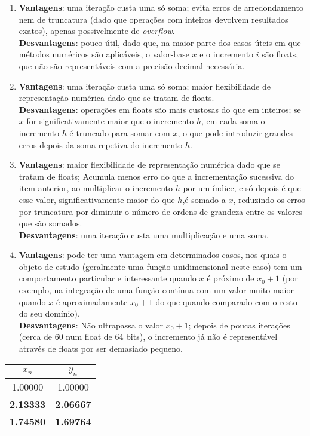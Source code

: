 \setcounter{chapter}{15}

\begin{enumerate}
    \item
    \textbf{Vantagens}: uma iteração custa uma só soma; evita erros de arredondamento nem de truncatura (dado que operações com inteiros devolvem resultados exatos), apenas possivelmente de \textit{overflow}.\\
    \textbf{Desvantagens}: pouco útil, dado que, na maior parte dos casos úteis em que métodos numéricos são aplicáveis, o valor-base $x$ e o incremento $i$ são floats, que não são representáveis com a precisão decimal necessária.
    \item 
    \textbf{Vantagens}: uma iteração custa uma só soma; maior flexibilidade de representação numérica dado que se tratam de floats.\\
    \textbf{Desvantagens}: operações em floats são mais custosas do que em inteiros; se $x$ for significativamente maior que o incremento $h$, em cada soma o incremento $h$ é truncado para somar com $x$, o que pode introduzir grandes erros depois da soma repetiva do incremento $h$.
    \item
    \textbf{Vantagens}: maior flexibilidade de representação numérica dado que se tratam de floats; Acumula menos erro do que a incrementação sucessiva do item anterior, ao multiplicar o incremento $h$ por um índice, e só depois é que esse valor, significativamente maior do que $h$,é somado a $x$, reduzindo os erros por truncatura por diminuir o número de ordens de grandeza entre os valores que são somados.\\
    \textbf{Desvantagens}: uma iteração custa uma multiplicação e uma soma.
    \item
    \textbf{Vantagens}: pode ter uma vantagem em determinados casos, nos quais o objeto de estudo (geralmente uma função unidimensional neste caso) tem um comportamento particular e interessante quando $x$ é próximo de $x_0+1$ (por exemplo, na integração de uma função contínua com um valor muito maior quando $x$ é aproximadamente $x_0+1$ do que quando comparado com o resto do seu domínio).\\
    \textbf{Desvantagens}: Não ultrapassa o valor $x_0+1$; depois de poucas iterações (cerca de 60 num float de 64 bits), o incremento já não é representável através de floats por ser demasiado pequeno.
\end{enumerate}



\begin{center}
    \begin{tabular}{c | c}
        $x_n$ & $y_n$ \\ \hline
        1.00000 & 1.00000 \\
        \textbf{2.13333} & \textbf{2.06667} \\
        \textbf{1.74580} & \textbf{1.69764}
    \end{tabular}
\end{center}

